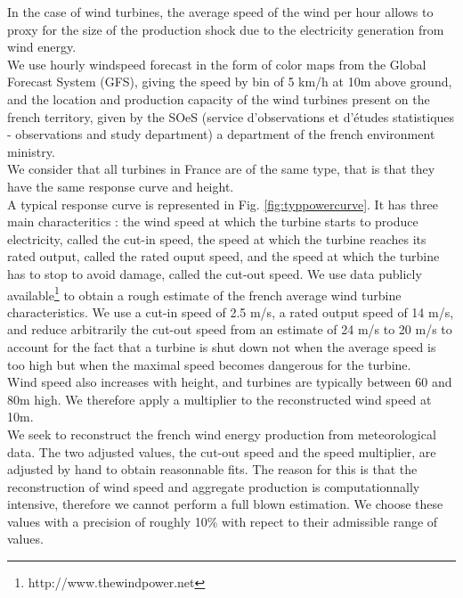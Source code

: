 In the case of wind turbines, the average speed of the wind per hour allows to proxy for the size of the production shock due to the electricity generation from wind energy. \\

We use hourly windspeed forecast in the form of color maps from the Global Forecast System (GFS), giving the speed by bin of 5 km/h at 10m above ground, and the location and production capacity of the wind turbines present on the french territory, given by the SOeS (service d'observations et d'études statistiques - observations and study department) a department of the french environment ministry. \\

We consider that all turbines in France are of the same type, that is that they have the same response curve and height. \\

A typical response curve is represented in Fig. \ref{fig:typpowercurve}. It has three main characteritics : the wind speed at which the turbine starts to produce electricity, called the cut-in speed, the speed at which the turbine reaches its rated output, called the rated ouput speed, and the speed at which the turbine has to stop to avoid damage, called the cut-out speed. We use data publicly available\footnote{http://www.thewindpower.net } to obtain a rough estimate of the french average wind turbine characteristics. We use a cut-in speed of 2.5 m/s, a rated output speed of 14 m/s, and reduce arbitrarily the cut-out speed from an estimate of 24 m/s to 20 m/s to account for the fact that a turbine is shut down not when the average speed is too high but when the maximal speed becomes dangerous for the turbine.\\ 

Wind speed also increases with height, and turbines are typically between 60 and 80m high. We therefore apply a multiplier to the reconstructed wind speed at 10m. \\

We seek to reconstruct the french wind energy production from meteorological data. The two adjusted values, the cut-out speed and the speed multiplier, are adjusted by hand to obtain reasonnable fits. The reason for this is that the reconstruction of wind speed and aggregate production is computationnally intensive, therefore we cannot perform a full blown estimation. We choose these values with a precision of roughly 10\% with repect to their admissible range of values. \\

